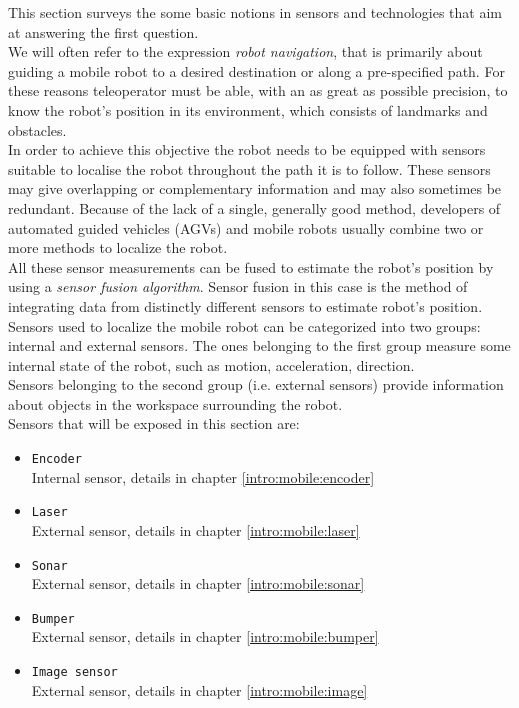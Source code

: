 This section surveys the some basic notions in sensors 
and technologies that aim at answering the
first question.
\\
We will often refer to the expression \textit{robot navigation},
that is primarily about guiding a mobile robot to a desired destination
or along a pre-specified path. For these reasons teleoperator must
be able, with an as great as possible precision, to know the robot's
position in its environment, which consists of landmarks and obstacles.
\\
In order to achieve this objective the robot needs to be equipped with
sensors suitable to localise the robot throughout the path it is to follow.
These sensors may give overlapping or complementary information and may
also sometimes be redundant. Because of the lack of a single, generally
good method, developers of  automated guided vehicles (AGVs) and mobile
robots usually combine two or more methods to localize the robot.
\\
All these sensor measurements can be fused to estimate the robot's
position by using a \textit{sensor fusion algorithm}. Sensor fusion
in this case is the method of integrating data from distinctly
different sensors to estimate robot's position.
\\
Sensors used to localize the mobile robot can be categorized into
two groups: internal and external sensors. The ones belonging to the first
group measure some internal state of the robot, such as motion, acceleration,
direction.
\\
Sensors belonging to the second group (i.e. external sensors) provide information
about objects in the workspace surrounding the robot.
\\
Sensors that will be exposed in this section are:
\begin{itemize}
\item \texttt{Encoder} \\
  Internal sensor, details in chapter \ref{intro:mobile:encoder}
\item \texttt{Laser} \\
  External sensor, details in chapter \ref{intro:mobile:laser}
\item \texttt{Sonar} \\
  External sensor, details in chapter \ref{intro:mobile:sonar}
\item \texttt{Bumper} \\
  External sensor, details in chapter \ref{intro:mobile:bumper}
\item \texttt{Image sensor} \\
  External sensor, details in chapter \ref{intro:mobile:image}
\end{itemize}

